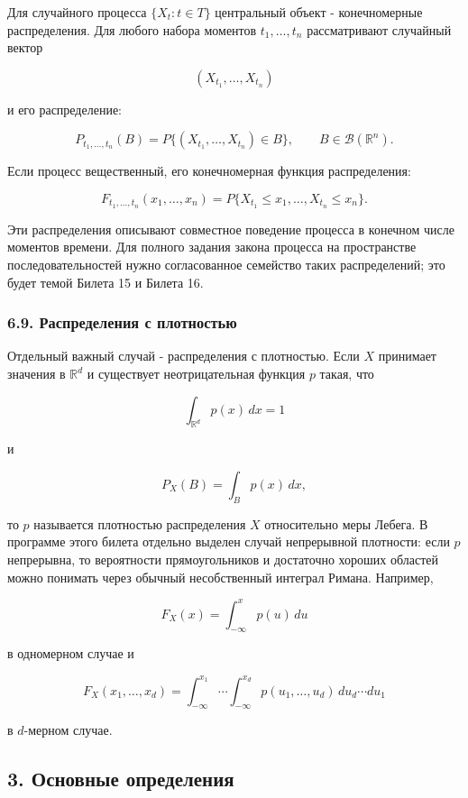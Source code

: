 \documentclass[
  11pt,
  a4paper,
]{article}
\begin{document}
Для случайного процесса \(\{X_t:t\in T\}\) центральный объект -
конечномерные распределения. Для любого набора моментов
\(t_1,\ldots,t_n\) рассматривают случайный вектор

\[
(X_{t_1},\ldots,X_{t_n})
\]

и его распределение:

\[
P_{t_1,\ldots,t_n}(B)
=
P\{(X_{t_1},\ldots,X_{t_n})\in B\},
\qquad B\in\mathcal B(\mathbb R^n).
\]

Если процесс вещественный, его конечномерная функция распределения:

\[
F_{t_1,\ldots,t_n}(x_1,\ldots,x_n)
=
P\{X_{t_1}\le x_1,\ldots,X_{t_n}\le x_n\}.
\]

Эти распределения описывают совместное поведение процесса в конечном
числе моментов времени. Для полного задания закона процесса на
пространстве последовательностей нужно согласованное семейство таких
распределений; это будет темой Билета 15 и Билета 16.

\subsubsection{6.9. Распределения с
плотностью}\label{ux440ux430ux441ux43fux440ux435ux434ux435ux43bux435ux43dux438ux44f-ux441-ux43fux43bux43eux442ux43dux43eux441ux442ux44cux44e}

Отдельный важный случай - распределения с плотностью. Если \(X\)
принимает значения в \(\mathbb R^d\) и существует неотрицательная
функция \(p\) такая, что

\[
\int_{\mathbb R^d}p(x)\,dx=1
\]

и

\[
P_X(B)=\int_B p(x)\,dx,
\]

то \(p\) называется плотностью распределения \(X\) относительно меры
Лебега. В программе этого билета отдельно выделен случай непрерывной
плотности: если \(p\) непрерывна, то вероятности прямоугольников и
достаточно хороших областей можно понимать через обычный несобственный
интеграл Римана. Например,

\[
F_X(x)=\int_{-\infty}^{x}p(u)\,du
\]

в одномерном случае и

\[
F_X(x_1,\ldots,x_d)
=
\int_{-\infty}^{x_1}\cdots\int_{-\infty}^{x_d}
p(u_1,\ldots,u_d)\,du_d\cdots du_1
\]

в \(d\)-мерном случае.

\subsection{3. Основные
определения}\label{ux43eux441ux43dux43eux432ux43dux44bux435-ux43eux43fux440ux435ux434ux435ux43bux435ux43dux438ux44f}
\end{document}
